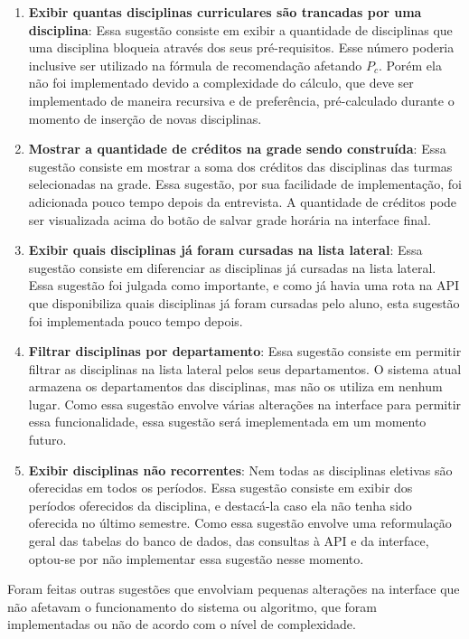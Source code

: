 \begin{enumerate}
    \item \textbf{Exibir quantas disciplinas curriculares são trancadas por uma disciplina}: Essa sugestão consiste em exibir a quantidade de disciplinas que uma disciplina bloqueia através dos seus pré-requisitos. Esse número poderia inclusive ser utilizado na fórmula de recomendação afetando $P_c$. Porém ela não foi implementado devido a complexidade do cálculo, que deve ser implementado de maneira recursiva e de preferência, pré-calculado durante o momento de inserção de novas disciplinas.
    
    \item \textbf{Mostrar a quantidade de créditos na grade sendo construída}: Essa sugestão consiste em mostrar a soma dos créditos das disciplinas das turmas selecionadas na grade. Essa sugestão, por sua facilidade de implementação, foi adicionada pouco tempo depois da entrevista. A quantidade de créditos pode ser visualizada acima do botão de salvar grade horária na interface final.
    
    \item \textbf{Exibir quais disciplinas já foram cursadas na lista lateral}: Essa sugestão consiste em diferenciar as disciplinas já cursadas na lista lateral. Essa sugestão foi julgada como importante, e como já havia uma rota na API que disponibiliza quais disciplinas já foram cursadas pelo aluno, esta sugestão foi implementada pouco tempo depois.

    \item \textbf{Filtrar disciplinas por departamento}: Essa sugestão consiste em permitir filtrar as disciplinas na lista lateral pelos seus departamentos. O sistema atual armazena os departamentos das disciplinas, mas não os utiliza em nenhum lugar. Como essa sugestão envolve várias alterações na interface para permitir essa funcionalidade, essa sugestão será imeplementada em um momento futuro.
    
    \item \textbf{Exibir disciplinas não recorrentes}: Nem todas as disciplinas eletivas são oferecidas em todos os períodos. Essa sugestão consiste em exibir dos períodos oferecidos da disciplina, e destacá-la caso ela não tenha sido oferecida no último semestre. Como essa sugestão envolve uma reformulação geral das tabelas do banco de dados, das consultas à API e da interface, optou-se por não implementar essa sugestão nesse momento. 
\end{enumerate}

Foram feitas outras sugestões que envolviam pequenas alterações na interface que não afetavam o funcionamento do sistema ou algoritmo, que foram implementadas ou não de acordo com o nível de complexidade.